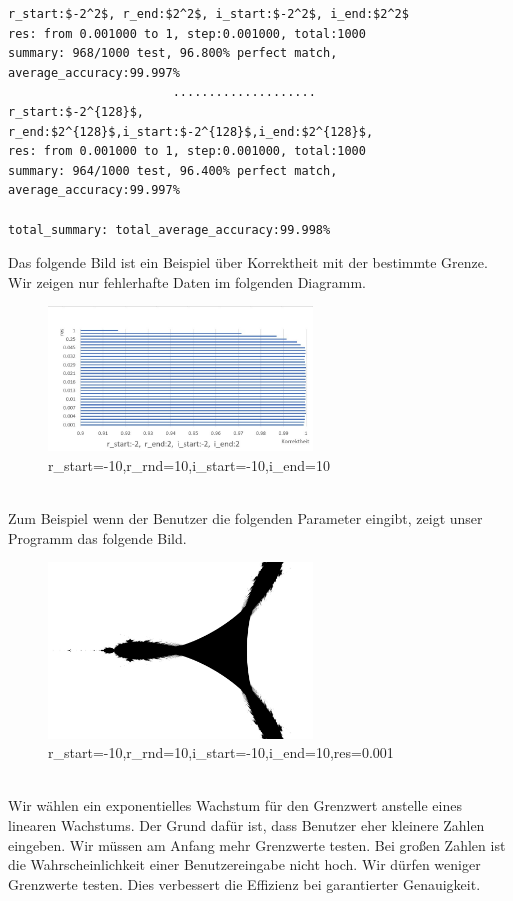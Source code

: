 \documentclass[course=erap]{aspdoc}
\begin{document}
 \begin{lstlisting}[mathescape=true]
r_start:$-2^2$, r_end:$2^2$, i_start:$-2^2$, i_end:$2^2$
res: from 0.001000 to 1, step:0.001000, total:1000
summary: 968/1000 test, 96.800% perfect match, average_accuracy:99.997%
                       ....................
r_start:$-2^{128}$, r_end:$2^{128}$,i_start:$-2^{128}$,i_end:$2^{128}$,
res: from 0.001000 to 1, step:0.001000, total:1000
summary: 964/1000 test, 96.400% perfect match, average_accuracy:99.997%

total_summary: total_average_accuracy:99.998%
\end{lstlisting}
Das folgende Bild ist ein Beispiel über Korrektheit mit der bestimmte Grenze. Wir zeigen nur fehlerhafte Daten im folgenden Diagramm.
\begin{figure}[htb]
\centering
\includegraphics [width=7cm] {Korrektheit.jpg}
\caption{r\_start=-10,r\_rnd=10,i\_start=-10,i\_end=10}
\label{fig:label}
\end{figure}
\\Zum Beispiel wenn der Benutzer die folgenden Parameter eingibt, zeigt unser Programm das folgende Bild.
\begin{figure}[htb]
\centering
\includegraphics [width=7cm] {ddd.png}
\caption{r\_start=-10,r\_rnd=10,i\_start=-10,i\_end=10,res=0.001}
\label{fig:label}
\end{figure}
\\Wir wählen ein exponentielles Wachstum für den Grenzwert anstelle eines linearen Wachstums. Der Grund dafür ist, dass Benutzer eher kleinere Zahlen eingeben. Wir müssen am Anfang mehr Grenzwerte testen. Bei großen Zahlen ist die Wahrscheinlichkeit einer Benutzereingabe nicht hoch. Wir dürfen weniger Grenzwerte testen. Dies verbessert die Effizienz bei garantierter Genauigkeit.
\end{document}
